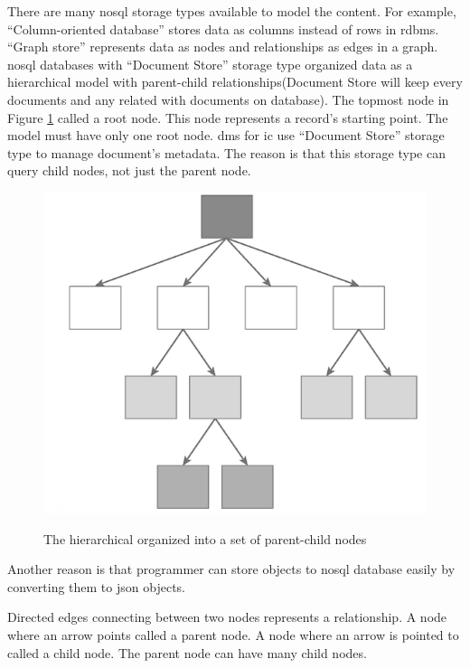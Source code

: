 There are many \gls{nosql} storage types available to model the content.
For example, \enquote{Column-oriented database} stores data as columns instead of rows in \gls{rdbms}.
\enquote{Graph store} represents data as nodes and relationships as edges in a graph.
\gls{nosql} databases with \enquote{Document Store} storage type organized data as a hierarchical model with parent-child relationships(Document Store will keep every documents and any related with documents on database).
The topmost node in Figure \ref{arch-node} called a root node.
This node represents a record's starting point.
The model must have only one root node.
\gls{dms} for \gls{ic} use \enquote{Document Store} storage type to manage document's metadata.
The reason is that this storage type can query child nodes, not just the parent node.
\begin{figure}[h]
	\centering
	\caption{The hierarchical organized into a set of parent-child nodes}
	\includegraphics[scale=0.48]{res/bg-knowledge/nosql-hierarchical}
	\label{arch-node}
\end{figure}
Another reason is that programmer can store objects to \gls{nosql} database easily by converting them to \gls{json} objects.

Directed edges connecting between two nodes represents a relationship.
A node where an arrow points called a parent node.
A node where an arrow is pointed to called a child node.
The parent node can have many child nodes. 



